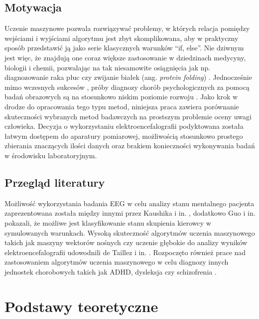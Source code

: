 \documentclass{./assets/wfis}
\begin{document}
\section{Motywacja}
Uczenie maszynowe pozwala rozwiązywać problemy, w których relacja pomiędzy wejściami i wyjściami algorytmu jest zbyt skomplikowana, aby w praktyczny sposób przedstawić ją jako serie klasycznych warunków “if, else”. Nie dziwnym jest więc, że znajdują one coraz większe zastosowanie w dziedzinach medycyny, biologii i chemii, pozwalając na tak niesamowite osiągnięcia jak np. diagnozowanie raka płuc \cite{li_machine_2022} czy zwijanie białek (ang. \textit{protein folding}) \cite{jumper_highly_2021}. Jednocześnie mimo wczesnych sukcesów \cite{some comparasion}, próby diagnozy chorób psychologicznych za pomocą badań obrazowych są na stosunkowo niskim poziomie rozwoju \cite{badania adhd i podobne}. Jako krok w drodze do opracowania tego typu metod, niniejsza praca zawiera porównanie skuteczności wybranych metod badawczych na prostszym problemie oceny uwagi człowieka. Decyzja o wykorzystaniu elektroencefalografii podyktowana została łatwym dostępem do aparatury pomiarowej, możliwością stosunkowo prostego zbierania znaczących ilości danych oraz brakiem konieczności wykonywania badań w środowisku laboratoryjnym.

\section{Przegląd literatury}
Możliwość wykorzystania badania EEG w celu analizy stanu mentalnego pacjenta zaprezentowana została między innymi przez Kaushika i in. \cite{kaushik_decoding_2022}, dodatkowo Guo i in. \cite{guo_detection_2018} pokazali, że możliwe jest klasyfikowanie stanu skupienia kierowcy w symulowanych warunkach. Wysoką skuteczność algorytmów uczenia maszynowego takich jak maszyny wektorów nośnych czy uczenie głębokie do analizy wyników elektroencefalografii udowodnili de Taillez i in. \cite{de_taillez_machine_2020}. Rozpoczęto również prace nad zastosowaniem algorytmów uczenia maszynowego w celu diagnozy innych jednostek chorobowych takich jak ADHD, dysleksja czy schizofrenia \cite{ahire_comprehensive_2022, joshi_review_2021, clarke_eeg_2002}.


\chapter{Podstawy teoretyczne}
\end{document}
